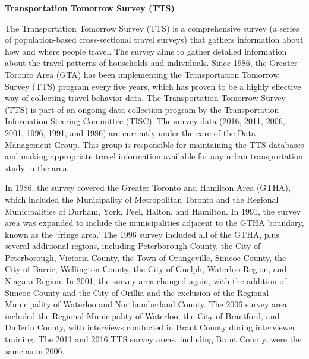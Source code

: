 \documentclass[12pt,twoside]{reedthesis}
\begin{document}
\textbf{Transportation Tomorrow Survey (TTS)}

The Transportation Tomorrow Survey (TTS) is a comprehensive survey (a series of population-based cross-sectional travel surveys) that gathers information about how and where people travel. The survey aims to gather detailed information about the travel patterns of households and individuals. Since 1986, the Greater Toronto Area (GTA) has been implementing the Transportation Tomorrow Survey (TTS) program every five years, which has proven to be a highly effective way of collecting travel behavior data. The Transportation Tomorrow Survey (TTS) is part of an ongoing data collection program by the Transportation Information Steering Committee (TISC). The survey data (2016, 2011, 2006, 2001, 1996, 1991, and 1986) are currently under the care of the Data Management Group. This group is responsible for maintaining the TTS databases and making appropriate travel information available for any urban transportation study in the area.

In 1986, the survey covered the Greater Toronto and Hamilton Area (GTHA), which included the Municipality of Metropolitan Toronto and the Regional Municipalities of Durham, York, Peel, Halton, and Hamilton. In 1991, the survey area was expanded to include the municipalities adjacent to the GTHA boundary, known as the `fringe area.' The 1996 survey included all of the GTHA, plus several additional regions, including Peterborough County, the City of Peterborough, Victoria County, the Town of Orangeville, Simcoe County, the City of Barrie, Wellington County, the City of Guelph, Waterloo Region, and Niagara Region. In 2001, the survey area changed again, with the addition of Simcoe County and the City of Orillia and the exclusion of the Regional Municipality of Waterloo and Northumberland County. The 2006 survey area included the Regional Municipality of Waterloo, the City of Brantford, and Dufferin County, with interviews conducted in Brant County during interviewer training. The 2011 and 2016 TTS survey areas, including Brant County, were the same as in 2006.
\end{document}

